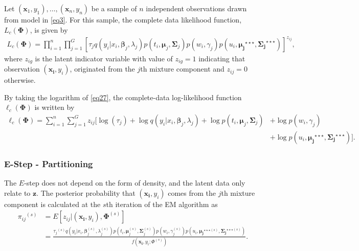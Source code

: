 \documentclass[11pt,letterpaper]{article}
\numberwithin{equation}{section}
\numberwithin{equation}{section}
\numberwithin{equation}{section}
\begin{document}
Let $(\bm x_1, y_1),\ldots, (\bm x_n, y_n)$ be a sample of $n$ independent observations drawn from model in \eqref{eq3}.
For this sample, the complete data likelihood function, $L_c(\bm\Phi)$, is given by
\begin{align}
L_c(\bm\Phi)=\prod_{i=1}^{n}\prod_{j=1}^{G}\left[{\tau_j}q(y_i|x_i, \bm \beta_j, \lambda_{j})p(t_i, \bm\mu_j, \bm\Sigma_j) p(w_i, \gamma_j)p(u_i, \bm{\mu_j}^{\star\star\star},\bm{\Sigma_j}^{\star\star\star}) \right]^{z_{ij}},
\label{eq27}
\end{align}
where $z_{ig}$ is the latent indicator variable with value of $z_{ig}=1$ indicating that observation $(\bm{x_i}, y_i)$, originated from the $j$th mixture component and $z_{ij}=0$ otherwise.

By taking the logarithm of \eqref{eq27}, the complete-data log-likelihood function $\ell_c(\bm\Phi)$ is written by
\begin{equation*}\begin{split}
\ell_c(\bm\Phi)= \sum_{i=1}^{n}\sum_{j=1}^{G}{z_{ij}}\big[\log(\tau_{j}) + \log{q}(y_i|x_i,\bm \beta_j,\lambda_j)+ \log p(t_i, \bm\mu_j, \bm\Sigma_j) & + \log p(w_i, \gamma_j)\\& +\log {p}(u_i, \bm{\mu_j}^{\star\star\star},\bm{\Sigma_j}^{\star\star\star}) \big].
\label{eq28}
\end{split}\end{equation*}

\subsubsection{E-Step - Partitioning}
The $E$-step does not depend on the form of density, and the latent data only relate to $\bm z$. %
The posterior probability that $(\bm{x_i}, y_i)$ comes from the $j$th mixture component is calculated at the $s$th iteration of the EM algorithm as
\begin{equation*}\begin{split}
    {\pi_{ij}}^{(s)} &= {E}[z_{ij} |(\bm{x_i}, y_i), \bm{\Phi}^{(s)}]\\
     &= \frac{{\tau_j}^{(s)}q(y_i|x_i, \bm \beta_j^{(s)}, \lambda^{(s)}_{j})p(t_i, \bm\mu_j^{(s)}, \bm\Sigma_j^{(s)}) p(w_i, \gamma_j^{(s)})p(u_i, \bm{\mu_j}^{\star\star\star (s)},\bm{\Sigma_j}^{\star\star\star (s)})}{f(\bm{x_i}, y_i; \Phi^{(s)})
\label{eq29}                       }.
\end{split}\end{equation*}
\end{document}
